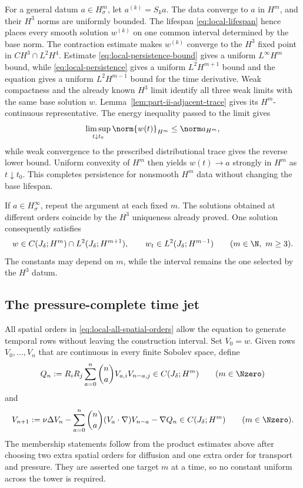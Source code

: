 For a general datum \(a\in H^m_\sigma\), let \(a^{(k)}=S_ka\).
The data converge to \(a\) in \(H^m\), and their \(H^3\) norms are uniformly bounded.
The lifespan \eqref{eq:local-lifespan} hence places every smooth solution \(w^{(k)}\) on one common interval determined by the base norm.
The contraction estimate makes \(w^{(k)}\) converge to the \(H^3\) fixed point in \(C H^3\cap L^2H^4\).
Estimate \eqref{eq:local-persistence-bound} gives a uniform \(L^\infty H^m\) bound, while \eqref{eq:local-persistence} gives a uniform \(L^2H^{m+1}\) bound and the equation gives a uniform \(L^2H^{m-1}\) bound for the time derivative.
Weak compactness and the already known \(H^3\) limit identify all three weak limits with the same base solution \(w\).
Lemma~\ref{lem:part-ii-adjacent-trace} gives its \(H^m\)-continuous representative.
The energy inequality passed to the limit gives
\[
 \limsup_{t\downarrow t_0}\norm{w(t)}_{H^m}\le\norm a_{H^m},
\]
while weak convergence to the prescribed distributional trace gives the reverse lower bound.
Uniform convexity of \(H^m\) then yields \(w(t)\to a\) strongly in \(H^m\) as \(t\downarrow t_0\).
This completes persistence for nonsmooth \(H^m\) data without changing the base lifespan.

If \(a\in H^\infty_\sigma\), repeat the argument at each fixed \(m\).
The solutions obtained at different orders coincide by the \(H^3\) uniqueness already proved.
One solution consequently satisfies
\begin{equation}
 w\in C(J_\delta;H^m)\cap L^2(J_\delta;H^{m+1}),
 \qquad
 w_t\in L^2(J_\delta;H^{m-1})
 \qquad(m\in\N,\ m\ge3).
 \label{eq:local-all-spatial-orders}
\end{equation}
The constants may depend on \(m\), while the interval remains the one selected by the \(H^3\) datum.

\subsection{The pressure-complete time jet}

All spatial orders in \eqref{eq:local-all-spatial-orders} allow the equation to generate temporal rows without leaving the construction interval.
Set \(V_0=w\).
Given rows \(V_0,\ldots,V_n\) that are continuous in every finite Sobolev space, define
\begin{equation}
 Q_n
 :=R_iR_j\sum_{a=0}^{n}\binom naV_{a,i}V_{n-a,j}
 \in C(J_\delta;H^m)
 \qquad(m\in\Nzero)
 \label{eq:local-pressure-time-row}
\end{equation}
and
\begin{equation}
 V_{n+1}
 :=\nu\Delta V_n
 -\sum_{a=0}^{n}\binom na(V_a\cdot\nabla)V_{n-a}
 -\nabla Q_n
 \in C(J_\delta;H^m)
 \qquad(m\in\Nzero).
 \label{eq:local-velocity-time-row}
\end{equation}
The membership statements follow from the product estimates above after choosing two extra spatial orders for diffusion and one extra order for transport and pressure.
They are asserted one target \(m\) at a time, so no constant uniform across the tower is required.


